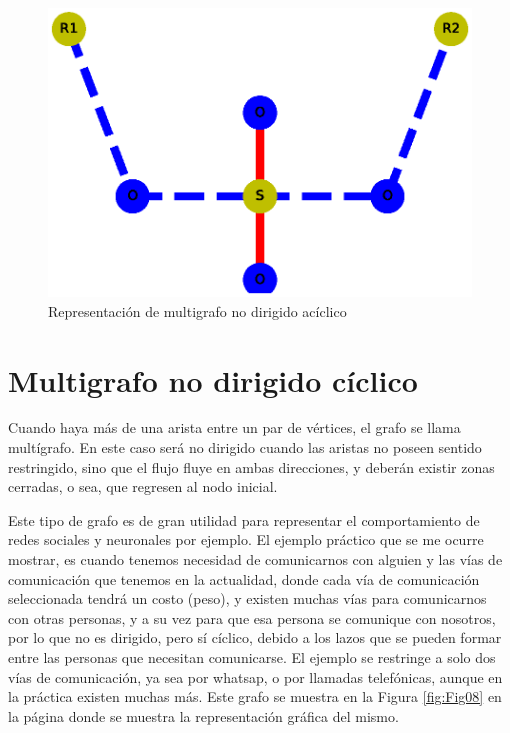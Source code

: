 \documentclass{article}
\begin{document}


\begin{figure}
    \centering
    \includegraphics[scale=0.6]{imagenes/Fig07.eps}
    \caption{Representación de multigrafo no dirigido acíclico}
    \label{fig:Fig07}
\end{figure}

\section{Multigrafo no dirigido cíclico}

Cuando haya más de una arista entre un par de vértices, el grafo se llama multígrafo. En este caso será no dirigido cuando las aristas no poseen sentido restringido, sino que el flujo fluye en ambas direcciones, y deberán existir zonas cerradas, o sea, que regresen al nodo inicial.

Este tipo de grafo es de gran utilidad para representar el comportamiento de redes sociales y neuronales por ejemplo. 
El ejemplo práctico que se me ocurre mostrar, es cuando tenemos necesidad de comunicarnos con alguien y las vías de comunicación que tenemos en la actualidad, donde cada vía de comunicación seleccionada tendrá un costo (peso), y existen muchas vías para comunicarnos con otras personas, y a su vez para que esa persona se comunique con nosotros, por lo que no es dirigido, pero sí cíclico, debido a los lazos que se pueden formar entre las personas que necesitan comunicarse. El ejemplo se restringe a solo dos vías de comunicación, ya sea por whatsap, o por llamadas telefónicas, aunque en la práctica existen muchas más. Este grafo se muestra en la Figura \ref{fig:Fig08} en la página \pageref{fig:Fig08} donde se muestra la representación gráfica del mismo.
\end{document}
